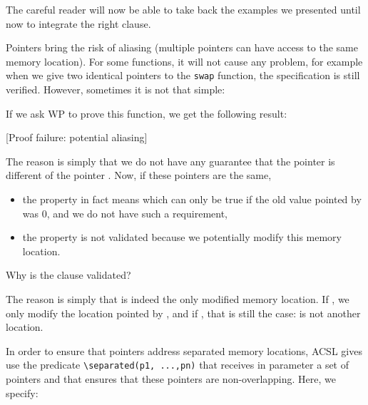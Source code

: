 


The careful reader will now be able to take back the examples we
presented until now to integrate the right  clause.





Pointers bring the risk of aliasing (multiple pointers can have access
to the same memory location). For some functions, it will not cause any
problem, for example when we give two identical pointers to the
\texttt{swap} function, the specification is still verified. However,
sometimes it is not that simple:






If we ask WP to prove this function, we get the following result:



[Proof failure: potential aliasing]


The reason is simply that we do not have any guarantee that the pointer
 is different of the pointer . Now, if these
pointers are the same,



\begin{itemize}
\item   the property  in fact
  means  which can only
  be true if the old value pointed by  was $0$, and we do
  not have such a requirement,
\item
  the property  is not validated
  because we potentially modify this memory location.
\end{itemize}


\begin{Question}
  Why is the  clause validated?

  The reason is simply that  is indeed the only modified memory
  location. If , we only modify the location pointed by
  , and if , \textbar{} that is still the case:
   is not another location.
\end{Question}


In order to ensure that pointers address separated memory locations,
ACSL gives use the predicate
\texttt{\textbackslash{}separated(p1,\ ...,pn)} that receives in
parameter a set of pointers and that ensures that these pointers are
non-overlapping. Here, we specify:



